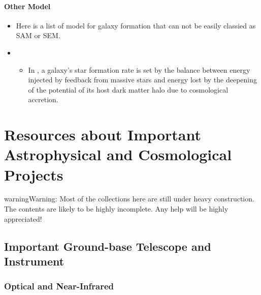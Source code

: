 \documentclass[letterpaper,10pt,english]{sphinxmanual}
\begin{document}
\paragraph{Other Model}
\label{\detokenize{resource/astro/topics/galaxy_formation_model:other-model}}\begin{itemize}
\item {} 
Here is a list of model for galaxy formation that can not be easily
classied as SAM or SEM.

\item {} 
\begin{itemize}
\item {} 
In , a galaxy’s star formation rate is set by the balance
between energy injected by feedback from massive stars and energy
lost by the deepening of the potential of its host dark matter
halo due to cosmological accretion.

\end{itemize}

\end{itemize}


\section{Resources about Important Astrophysical and Cosmological Projects}
\label{\detokenize{astro_project:resources-about-important-astrophysical-and-cosmological-projects}}\label{\detokenize{astro_project::doc}}
\begin{sphinxadmonition}{warning}{Warning:}
Most of the collections here are still under heavy construction. The contents are likely to be
highly incomplete. Any help will be highly appreciated!
\end{sphinxadmonition}


\subsection{Important Ground-base Telescope and Instrument}
\label{\detokenize{astro_project:important-ground-base-telescope-and-instrument}}

\subsubsection{Optical and Near-Infrared}
\label{\detokenize{astro_project:optical-and-near-infrared}}
\end{document}
